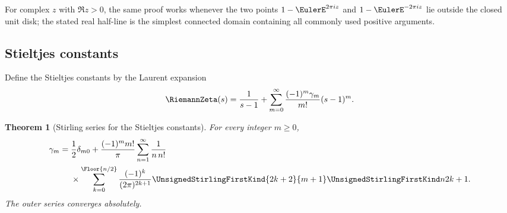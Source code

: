 \documentclass[11pt,a4paper,oneside,openany]{book}
\newtheorem{theorem}{Theorem}[chapter]
\theoremstyle{definition}
\theoremstyle{remark}
\begin{document}
For complex $z$ with $\Re z>0$, the same proof works whenever the two points
$1-\EulerE^{2\pi iz}$ and $1-\EulerE^{-2\pi iz}$ lie outside the closed unit disk; the stated
real half-line is the simplest connected domain containing all commonly used
positive arguments.

\subsection{Stieltjes constants}
Define the Stieltjes constants by the Laurent expansion
\begin{equation}
\label{eq:stieltjes-definition}
 \RiemannZeta(s)=\frac1{s-1}+\sum_{m=0}^{\infty}
 \frac{(-1)^m\gamma_m}{m!}(s-1)^m.
\end{equation}

\begin{theorem}[Stirling series for the Stieltjes constants]
\label{thm:stieltjes-stirling-series}
For every integer $m\ge0$,
\begin{equation}
\label{eq:stieltjes-stirling-series}
\begin{aligned}
 \gamma_m={}&\frac12\delta_{m0}
 +\frac{(-1)^m m!}{\pi}
 \sum_{n=1}^{\infty}\frac1{n\,n!}\\
 &\times\sum_{k=0}^{\Floor{n/2}}
 \frac{(-1)^k}{(2\pi)^{2k+1}}
 \UnsignedStirlingFirstKind{2k+2}{m+1}\UnsignedStirlingFirstKind n{2k+1}.
\end{aligned}
\end{equation}
The outer series converges absolutely.
\end{theorem}
\end{document}
